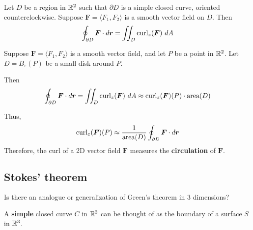 \begin{theorem}
    Let $D$ be a region in $\mathbb{R}^2$ such that $\partial D$ is a simple closed curve, oriented counterclockwise.  Suppose $\bm{F} = \langle F_1, F_2 \rangle$ is a smooth vector field on $D$.
    Then
    $$\oint_{\partial D} \bm{F} \cdot d\bm{r} = \iint_D \textnormal{curl}_z(\bm{F}) \ dA$$
        \end{theorem}

\begin{corollary}
    Suppose $\bm{F} = \langle F_1, F_2 \rangle$ is a smooth vector field, and let $P$ be a point in $\mathbb{R}^2$.  Let $D = B_\varepsilon(P)$ be a small disk around $P$. 
    
    Then
    $$\oint_{\partial D} \bm{F} \cdot d\bm{r} = \iint_D \textnormal{curl}_z(\bm{F}) \ dA \approx \textnormal{curl}_z(\bm{F})(P) \cdot \textnormal{area}(D)$$

    Thus, $$\textnormal{curl}_z(\bm{F})(P) \approx \frac{1}{\textnormal{area}(D)}\oint_{\partial D} \bm{F} \cdot d\bm{r}$$
    Therefore, the curl of a 2D vector field $\bm{F}$ measures the \textbf{circulation} of $\bm{F}$.
    \end{corollary}

\subsection{Stokes' theorem}

\begin{motivating}
    Is there an analogue or generalization of Green's theorem in 3 dimensions?
\end{motivating}

\begin{remark}
    A \textbf{simple} closed curve $C$ in $\mathbb{R}^3$ can be thought of as the boundary of a surface $S$ in $\mathbb{R}^3$.
    \end{remark}


